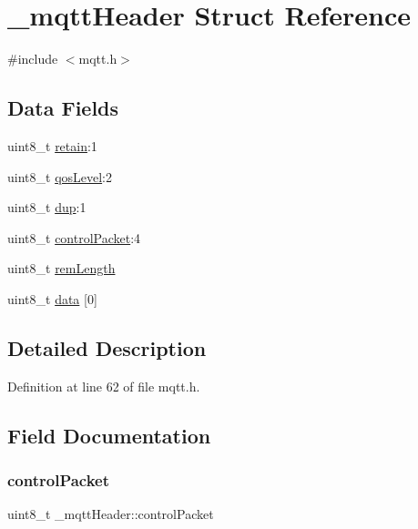 \hypertarget{struct__mqttHeader}{}\section{\+\_\+mqtt\+Header Struct Reference}
\label{struct__mqttHeader}


{\ttfamily \#include $<$mqtt.\+h$>$}

\subsection*{Data Fields}
\begin{DoxyCompactItemize}
\item 
uint8\+\_\+t \hyperlink{struct__mqttHeader_a4bb9f2efb2fad66697a49ca223404707}{retain}\+:1
\item 
uint8\+\_\+t \hyperlink{struct__mqttHeader_ad1968d139e05f0dbb0deeaffbe44200d}{qos\+Level}\+:2
\item 
uint8\+\_\+t \hyperlink{struct__mqttHeader_aaf6dd4ab86a9a77df65f661b7c2eb6a3}{dup}\+:1
\item 
uint8\+\_\+t \hyperlink{struct__mqttHeader_a81bf12c5a9d678f05619fa5b3d917516}{control\+Packet}\+:4
\item 
uint8\+\_\+t \hyperlink{struct__mqttHeader_ab2a0ef860aab83b8ac76bc9fe9d3cfe5}{rem\+Length}
\item 
uint8\+\_\+t \hyperlink{struct__mqttHeader_a210631612026cc00977602020ff7cf26}{data} \mbox{[}0\mbox{]}
\end{DoxyCompactItemize}


\subsection{Detailed Description}


Definition at line 62 of file mqtt.\+h.



\subsection{Field Documentation}
\mbox{\label{struct__mqttHeader_a81bf12c5a9d678f05619fa5b3d917516}} 
\subsubsection{\texorpdfstring{control\+Packet}{controlPacket}}
{\footnotesize\ttfamily uint8\+\_\+t \+\_\+mqtt\+Header\+::control\+Packet}



